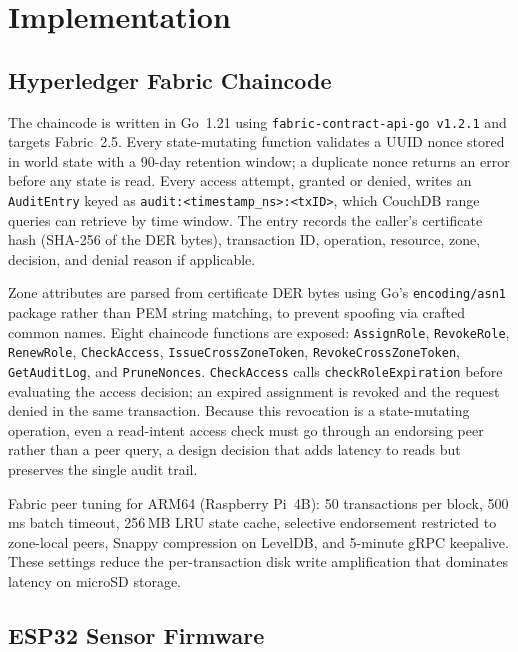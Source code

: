 \documentclass[a4paper,fleqn]{cas-dc}
\begin{document}
\section{Implementation}
\label{sec:implementation}

\subsection{Hyperledger Fabric Chaincode}
\label{subsec:chaincode}

The chaincode is written in Go~1.21 using
\texttt{fabric-contract-api-go~v1.2.1} and targets Fabric~2.5. Every
state-mutating function validates a UUID nonce stored in world state
with a 90-day retention window; a duplicate nonce returns an error
before any state is read. Every access attempt, granted or denied,
writes an \texttt{AuditEntry} keyed as
\texttt{audit:<timestamp\_ns>:<txID>}, which CouchDB range queries
can retrieve by time window. The entry records the caller's certificate
hash (SHA-256 of the DER bytes), transaction ID, operation, resource,
zone, decision, and denial reason if applicable.

Zone attributes are parsed from certificate DER bytes using Go's
\texttt{encoding/asn1} package rather than PEM string matching, to
prevent spoofing via crafted common names. Eight chaincode functions
are exposed: \texttt{AssignRole}, \texttt{RevokeRole},
\texttt{RenewRole}, \texttt{CheckAccess},
\texttt{IssueCrossZoneToken}, \texttt{RevokeCrossZoneToken},
\texttt{GetAuditLog}, and \texttt{PruneNonces}. \texttt{CheckAccess}
calls \texttt{checkRoleExpiration} before evaluating the access
decision; an expired assignment is revoked and the request denied in
the same transaction. Because this revocation is a state-mutating
operation, even a read-intent access check must go through an endorsing
peer rather than a peer query, a design decision that adds latency
to reads but preserves the single audit trail.

Fabric peer tuning for ARM64 (Raspberry Pi~4B): 50 transactions per
block, 500\,ms batch timeout, 256\,MB LRU state cache, selective
endorsement restricted to zone-local peers, Snappy compression on
LevelDB, and 5-minute gRPC keepalive. These settings reduce the
per-transaction disk write amplification that dominates latency on
microSD storage.

\subsection{ESP32 Sensor Firmware}
\label{subsec:esp32}
\end{document}

